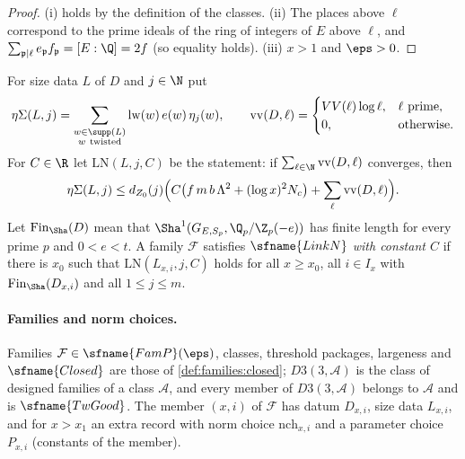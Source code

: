 \begin{proof}
(i) holds by the definition of the classes. (ii) The places above $\ell$ correspond to the prime ideals of the ring of integers of $E$
above $\ell$, and $\sum_{\mathfrak p\mid\ell}e_{\mathfrak p}f_{\mathfrak p}=[E:\Q]=2f$ \cite[Ch.~I, Prop.~8.2]{Neukirch1999} (so equality holds).
(iii) $x>1$ and $\eps>0$.
\end{proof}

\begin{definition}\label{pf:linkN:LinkN}
For size data $L$ of $D$ and $j\in\N$ put
\begin{equation}\label{eq:pf:linkN:etaSum}
\linkNeS(L,j)=\sum_{\substack{w\in\supp(L)\\ w\ \text{twisted}}}\linkNlw(w)\,e(w)\,\eta_j(w),\qquad
\mathrm{vv}(D,\ell)=\begin{cases}VV(\ell)\log\ell,&\ell\text{ prime},\\0,&\text{otherwise}.\end{cases}
\end{equation}
For $C\in\R$ let $\mathrm{LN}(L,j,C)$ be the statement: if $\sum_{\ell\in\N}\mathrm{vv}(D,\ell)$ converges, then
\begin{equation}\label{eq:pf:linkN:linkNat}
\eta\Sigma(L,j)\le d_{Z_0}(j)\Bigl(C\bigl(f\,m\,b\,\Lambda^2+(\log x)^2N_c\bigr)+\sum_{\ell}\mathrm{vv}(D,\ell)\Bigr).
\end{equation}
Let $\linkNfin(D)$ mean that $\Sha^1(G_{E,S_p},\Q_p/\Z_p(-e))$ has finite length for every prime $p$ and $0<e<t$. A
family $\mathcal F$ satisfies $\sfname{LinkN}$ \emph{with constant $C$} if there is $x_0$ such that $\mathrm{LN}(L_{x,i},j,C)$
holds for all $x\ge x_0$, all $i\in I_x$ with $\linkNfin(D_{x,i})$ and all $1\le j\le m$.
\end{definition}

\paragraph{Families and norm choices.}
Families $\mathcal F\in\sfname{FamP}(\eps)$, classes, threshold packages, largeness and $\sfname{Closed}$ are those of
\cref{def:families:closed}; $D3(3,\mathcal A)$ is the class of designed families of a class $\mathcal A$, and every member
of $D3(3,\mathcal A)$ belongs to $\mathcal A$ and is $\sfname{TwGood}$. The member $(x,i)$ of $\mathcal F$ has datum
$D_{x,i}$, size data $L_{x,i}$, and for $x>x_1$ an extra record with norm choice $\mathrm{nch}_{x,i}$ and a parameter
choice $P_{x,i}$ (constants of the member).

